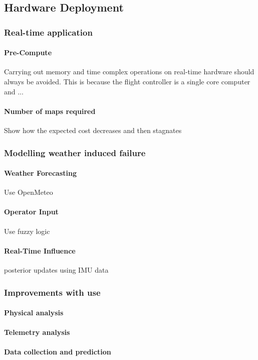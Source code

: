 \subsection{Hardware Deployment}

\subsubsection{Real-time application}
\paragraph{Pre-Compute}
Carrying out memory and time complex operations on real-time hardware should always be avoided. This is because the flight controller is a single core computer and ...
\paragraph{Number of maps required}
Show how the expected cost decreases and then stagnates

\subsubsection{Modelling weather induced failure}
\paragraph{Weather Forecasting}
Use OpenMeteo
\paragraph{Operator Input}
Use fuzzy logic
\paragraph{Real-Time Influence}
posterior updates using \gls{IMU data}

\subsubsection{Improvements with use}
\paragraph{Physical analysis}
\paragraph{Telemetry analysis}
\paragraph{Data collection and prediction}